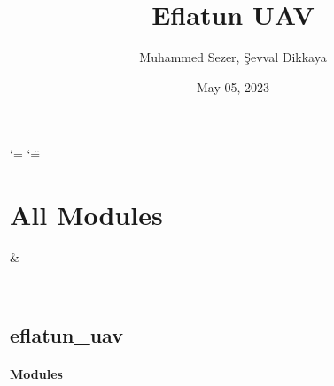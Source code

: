 \documentclass[letterpaper,10pt,english]{sphinxmanual}
\title{Eflatun UAV}
\date{May 05, 2023}
\author{Muhammed Sezer, Şevval Dikkaya}
\begin{document}
\ifdefined\shorthandoff
  \ifnum\catcode`\=\string=\active\shorthandoff{=}\fi
  \ifnum\catcode`\"=\active{}\fi
\fi

\pagestyle{empty}
\sphinxmaketitle
\pagestyle{plain}
\sphinxtableofcontents
\pagestyle{normal}
\label{\detokenize{index::doc}}


\sphinxstepscope


\chapter{All Modules}
\label{\detokenize{all_modules:all-modules}}\label{\detokenize{all_modules::doc}}

\begin{savenotes}\sphinxattablestart
\sphinxthistablewithglobalstyle
\sphinxthistablewithnovlinesstyle
\centering
\begin{tabulary}{\linewidth}[t]{}
\sphinxtoprule
\sphinxtableatstartofbodyhook
\sphinxAtStartPar
{\hyperref[\detokenize{generated/eflatun_uav:module-eflatun_uav}]{}}
&
\sphinxAtStartPar

\\
\sphinxbottomrule
\end{tabulary}
\sphinxtableafterendhook\par
\sphinxattableend\end{savenotes}

\sphinxstepscope


\section{eflatun\_uav}
\label{\detokenize{generated/eflatun_uav:module-eflatun_uav}}\label{\detokenize{generated/eflatun_uav:eflatun-uav}}\label{\detokenize{generated/eflatun_uav::doc}}\subsubsection*{Modules}
\end{document}
